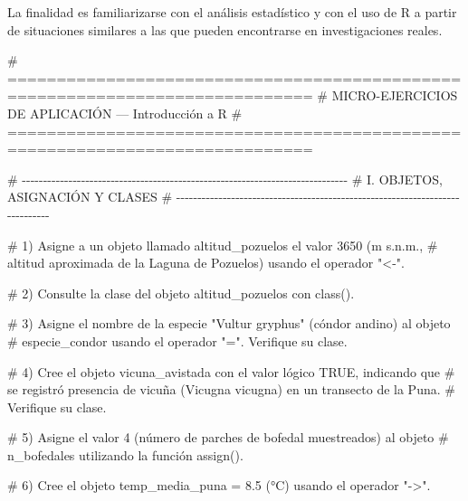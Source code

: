 \documentclass[
  spanish,
  letterpaper,
  DIV=11,
  numbers=noendperiod]{scrreprt}
\newenvironment{Shaded}{\begin{snugshade}}{\end{snugshade}}
\newcommand{\CommentTok}[1]{\textcolor[rgb]{0.37,0.37,0.37}{#1}}
\begin{document}
La finalidad es familiarizarse con el análisis estadístico y con el uso
de R a partir de situaciones similares a las que pueden encontrarse en
investigaciones reales.

\begin{Shaded}
\begin{Highlighting}[]

\CommentTok{\# =============================================================================}
\CommentTok{\# MICRO{-}EJERCICIOS DE APLICACIÓN — Introducción a R}
\CommentTok{\# =============================================================================}

\CommentTok{\# {-}{-}{-}{-}{-}{-}{-}{-}{-}{-}{-}{-}{-}{-}{-}{-}{-}{-}{-}{-}{-}{-}{-}{-}{-}{-}{-}{-}{-}{-}{-}{-}{-}{-}{-}{-}{-}{-}{-}{-}{-}{-}{-}{-}{-}{-}{-}{-}{-}{-}{-}{-}{-}{-}{-}{-}{-}{-}{-}{-}{-}{-}{-}{-}{-}{-}{-}{-}{-}{-}{-}{-}{-}{-}{-}{-}{-}}
\CommentTok{\# I. OBJETOS, ASIGNACIÓN Y CLASES}
\CommentTok{\# {-}{-}{-}{-}{-}{-}{-}{-}{-}{-}{-}{-}{-}{-}{-}{-}{-}{-}{-}{-}{-}{-}{-}{-}{-}{-}{-}{-}{-}{-}{-}{-}{-}{-}{-}{-}{-}{-}{-}{-}{-}{-}{-}{-}{-}{-}{-}{-}{-}{-}{-}{-}{-}{-}{-}{-}{-}{-}{-}{-}{-}{-}{-}{-}{-}{-}{-}{-}{-}{-}{-}{-}{-}{-}{-}{-}{-}}

\CommentTok{\# 1) Asigne a un objeto llamado \textquotesingle{}altitud\_pozuelos\textquotesingle{} el valor 3650 (m s.n.m.,}
\CommentTok{\#    altitud aproximada de la Laguna de Pozuelos) usando el operador "\textless{}{-}".}


\CommentTok{\# 2) Consulte la clase del objeto \textquotesingle{}altitud\_pozuelos\textquotesingle{} con class().}


\CommentTok{\# 3) Asigne el nombre de la especie "Vultur gryphus" (cóndor andino) al objeto}
\CommentTok{\#    \textquotesingle{}especie\_condor\textquotesingle{} usando el operador "=". Verifique su clase.}


\CommentTok{\# 4) Cree el objeto \textquotesingle{}vicuna\_avistada\textquotesingle{} con el valor lógico TRUE, indicando que}
\CommentTok{\#    se registró presencia de vicuña (Vicugna vicugna) en un transecto de la Puna.}
\CommentTok{\#    Verifique su clase.}


\CommentTok{\# 5) Asigne el valor 4 (número de parches de bofedal muestreados) al objeto}
\CommentTok{\#    \textquotesingle{}n\_bofedales\textquotesingle{} utilizando la función assign().}


\CommentTok{\# 6) Cree el objeto \textquotesingle{}temp\_media\_puna\textquotesingle{} = 8.5 (°C) usando el operador "{-}\textgreater{}".}



\end{Highlighting}
\end{Shaded}
\end{document}
